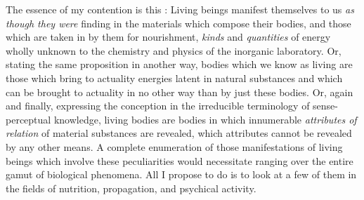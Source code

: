 \documentclass[a4paper, 11pt, oneside, polutonikogreek, english]{article}
\begin{document}
The essence of my contention is this : Living beings manifest themselves to us \emph{as though they were} finding in the materials which compose their bodies, and those which are taken in by them for nourishment, \emph{kinds} and \emph{quantities} of energy wholly unknown to the chemistry and physics of the inorganic laboratory. Or, stating the same proposition in another way, bodies which we know as living are those which bring to actuality energies latent in natural substances and which can be brought to actuality in no other way than by just these bodies. Or, again and finally, expressing the conception in the irreducible terminology of sense-perceptual knowledge, living bodies are bodies in which innumerable \emph{attributes of relation} of material substances are revealed, which attributes cannot be revealed by any other means. A complete enumeration of those manifestations of living beings which involve these peculiarities would necessitate ranging over the entire gamut of biological phenomena. All I propose to do is to look at a few of them in the fields of nutrition, propagation, and psychical activity.
\end{document}
